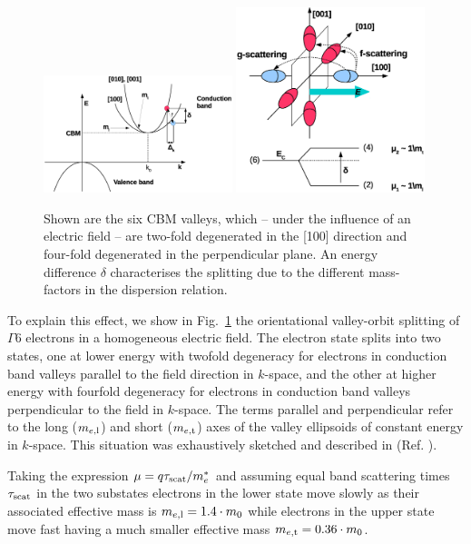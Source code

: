 \begin{figure}[tb]
 \centering
 \includegraphics[trim=0 0 50 0, width=0.49\textwidth]{figures/f-scat.eps}
 \includegraphics[trim=0 0 50 0, width=0.49\textwidth]{figures/degenerated-states.eps}
 \caption{Shown are the six CBM valleys, which -- under the influence of an electric field -- are two-fold degenerated in the [100] direction and four-fold degenerated in the perpendicular plane. 
 An energy difference $\delta$ characterises the splitting due to the different mass-factors in the dispersion relation. }
 \label{fig:gamma6}
\end{figure}

To explain this effect, we show in Fig.~\ref{fig:gamma6} the orientational valley-orbit splitting of $\Gamma6$ electrons in a homogeneous electric field. 
The electron state splits into two states, one at lower energy with twofold degeneracy for electrons in conduction band valleys parallel to the field direction in $k$-space,
 and the other at higher energy with fourfold degeneracy for electrons in conduction band valleys perpendicular to the field in $k$-space. 
The terms parallel and perpendicular refer to the long  ($m_{\mathnormal{e},\textrm{l}}$) and short ($m_{\mathnormal{e},\textrm{t}}$) axes of the valley ellipsoids of constant energy in $k$-space. 
This situation was exhaustively sketched and described in (Ref. \cite{lofas:032139}).

Taking the expression $\mu = \mathnormal{q} \tau_\textrm{scat} / m^{*}_{\mathnormal{e}}$ 
 and assuming equal band scattering times $\tau_\textrm{scat}$ in the two substates electrons in the lower state move slowly as their associated effective mass is $m_{\mathnormal{e},\textrm{l}} = 1.4 \cdot m_0$ 
while electrons in the upper state move fast having a much smaller effective mass $m_{\mathnormal{e},\textrm{t}} = 0.36\cdot m_0$.

